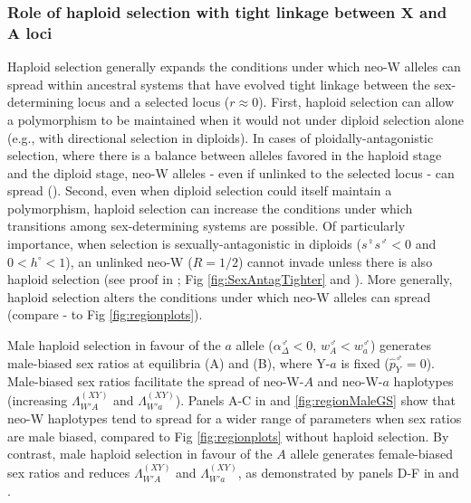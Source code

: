 \documentclass[10pt,letterpaper]{article}
\begin{document}
\subsubsection*{Role of haploid selection with tight linkage between $\mathbf{X}$ and $\mathbf{A}$ loci}

Haploid selection generally expands the conditions under which neo-W alleles can spread within ancestral systems that have evolved tight linkage between the sex-determining locus and a selected locus ($r \approx 0$).
First, haploid selection can allow a polymorphism to be maintained when it would not under diploid selection alone (e.g., with directional selection in diploids). 
In cases of ploidally-antagonistic selection, where there is a balance between alleles favored in the haploid stage and the diploid stage, neo-W alleles - even if unlinked to the selected locus - can spread ().
Second, even when diploid selection could itself maintain a polymorphism, haploid selection can increase the conditions under which transitions among sex-determining systems are possible.
Of particularly importance, when selection is sexually-antagonistic in diploids ($s^\female s^\male <0$ and $0<h^\circ<1$), an unlinked neo-W ($R=1/2$) cannot invade unless there is also haploid selection (see proof in ; Fig \ref{fig:SexAntagTighter} and ). 
More generally, haploid selection alters the conditions under which neo-W alleles can spread (compare - to Fig \ref{fig:regionplots}). 


Male haploid selection in favour of the $a$ allele ($\alpha_{\Delta}^\male<0$, $w_{A}^\male<w_{a}^\male$) generates male-biased sex ratios at equilibria (A) and (B), where Y-$a$ is fixed ($\hat{p}_{Y}^\male=0$). 
Male-biased sex ratios facilitate the spread of neo-W-$A$ and neo-W-$a$ haplotypes (increasing $\Lambda_{W'A}^{(XY)}$ and $\Lambda_{W'a}^{(XY)}$). 
Panels A-C in  and \ref{fig:regionMaleGS} show that neo-W haplotypes tend to spread for a wider range of parameters when sex ratios are male biased, compared to Fig \ref{fig:regionplots} without haploid selection. 
By contrast, male haploid selection in favour of the $A$ allele generates female-biased sex ratios and reduces $\Lambda_{W'A}^{(XY)}$ and $\Lambda_{W'a}^{(XY)}$, as demonstrated by panels D-F in  and . 
\end{document}
